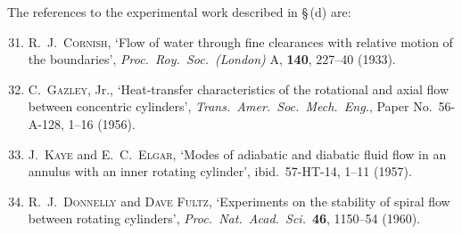 \noindent The references to the experimental work described in \S\,(d) are:

\begin{enumerate}\setcounter{enumi}{30}
\item R.~J.~\textsc{Cornish}, `Flow of water through fine clearances with relative motion of the boundaries', \emph{Proc.\ Roy.\ Soc.\ (London)} A, \textbf{140}, 227--40 (1933).

\item C.~\textsc{Gazley}, Jr., `Heat-transfer characteristics of the rotational and axial flow between concentric cylinders', \emph{Trans.\ Amer.\ Soc.\ Mech.\ Eng.}, Paper No.\ 56-A-128, 1--16 (1956).

\item J.~\textsc{Kaye} and E.~C.~\textsc{Elgar}, `Modes of adiabatic and diabatic fluid flow in an annulus with an inner rotating cylinder', ibid.\ 57-HT-14, 1--11 (1957).

\item R.~J.~\textsc{Donnelly} and \textsc{Dave Fultz}, `Experiments on the stability of spiral flow between rotating cylinders', \emph{Proc.\ Nat.\ Acad.\ Sci.}\ \textbf{46}, 1150--54 (1960).
\end{enumerate}
